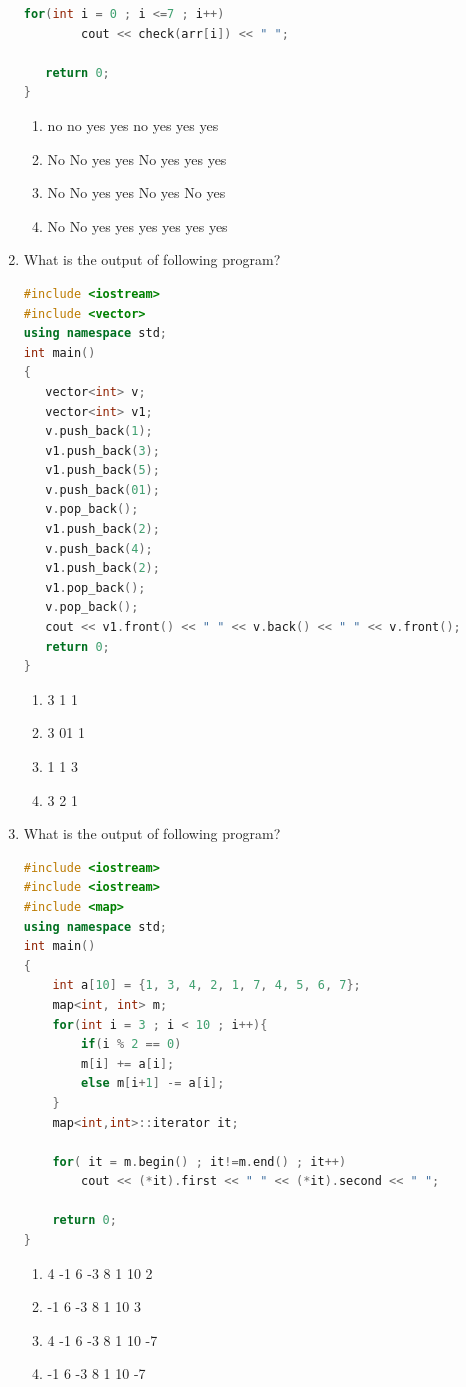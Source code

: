 \documentclass[10pt]{article}
\begin{document}
\begin{enumerate}
\begin{lstlisting}[language=C++]
    for(int i = 0 ; i <=7 ; i++)
        cout << check(arr[i]) << " ";

   return 0;
}

\end{lstlisting}
\begin{enumerate}
    \item no no yes yes no yes yes yes
    \item No No yes yes No yes yes yes
    \item No No yes yes No yes No yes
    \item No No yes yes yes yes yes yes
\end{enumerate}



\item What is the output of following program?
\begin{lstlisting}[language=C++]
#include <iostream>
#include <vector>
using namespace std;
int main()
{
   vector<int> v;
   vector<int> v1;
   v.push_back(1);
   v1.push_back(3);
   v1.push_back(5);
   v.push_back(01);
   v.pop_back();
   v1.push_back(2);
   v.push_back(4);
   v1.push_back(2);
   v1.pop_back();
   v.pop_back();
   cout << v1.front() << " " << v.back() << " " << v.front();
   return 0;
}

\end{lstlisting}
\begin{enumerate}
    \item 3 1 1
    \item 3 01 1
    \item 1 1 3
    \item 3 2 1
\end{enumerate}




\item What is the output of following program?
\begin{lstlisting}[language=C++]
#include <iostream>
#include <iostream>
#include <map>
using namespace std;
int main()
{
    int a[10] = {1, 3, 4, 2, 1, 7, 4, 5, 6, 7};
    map<int, int> m;
    for(int i = 3 ; i < 10 ; i++){
        if(i % 2 == 0)
        m[i] += a[i];
        else m[i+1] -= a[i];
    }
    map<int,int>::iterator it;
      
    for( it = m.begin() ; it!=m.end() ; it++)
        cout << (*it).first << " " << (*it).second << " ";
    
    return 0;
}
\end{lstlisting}
\begin{enumerate}
    \item 4 -1 6 -3 8 1 10 2
    \item -1 6 -3 8 1 10 3
    \item 4 -1 6 -3 8 1 10 -7
    \item -1 6 -3 8 1 10 -7
\end{enumerate}









\end{enumerate}
\end{document}

